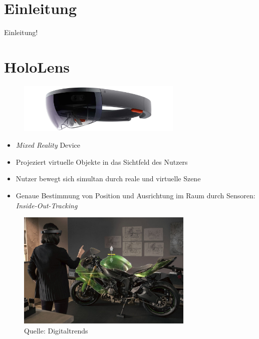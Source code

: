 \part{Einleitung}
\label{part:intro}

\begin{frame}[fragile]{}
Einleitung!
\end{frame}

\part{HoloLens}
\label{part:hololens}
\begin{frame}[fragile]{}
\begin{figure}[h!]
	\centering
	\includegraphics[width=0.7\textwidth]{images/hololens.jpg}
\end{figure}
\begin{itemize}
	\pause
	\item \textit{Mixed Reality} Device
	\pause
	\item Projeziert virtuelle Objekte in das Sichtfeld des Nutzers
	\pause
	\item Nutzer bewegt sich simultan durch reale und virtuelle Szene
	\pause
	\item Genaue Bestimmung von Position und Ausrichtung im Raum durch Sensoren: \textit{Inside-Out-Tracking}
\end{itemize}	
\end{frame}

\begin{frame}[fragile]{}
\begin{figure}[h!]
	\centering
	\includegraphics[width=0.75\textwidth]{images/HoloLens_Motorcycle.jpg}
	\setlength{\abovecaptionskip}{5pt plus 5pt minus 2pt}
	\caption*{Quelle: Digitaltrends}
\end{figure}
\end{frame}

